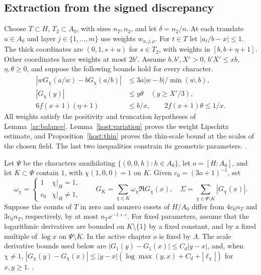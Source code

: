 \subsection{Extraction from the signed discrepancy}

Choose \(T\subset H\), \(T_2\subset A_0\), with sizes \(n_T,n_2\), and let \(\delta=n_2/n\). At each translate \(u\in A_0\) and layer \(j\in\{1,\dots,m\}\) use weights \(w_{u,j,\rho}\). For \(t\in T\) let \(|a_t/b-x|\le1\). The thick coordinates are \((0,1,s+u)\) for \(s\in T_2\), with weights in \([b,b+\eta+1]\). Other coordinates have weights at most \(2b'\). Assume \(b,b',X'>0\), \(b'X'\le xb\), \(\eta,\theta\ge0\), and suppose the following bounds hold for every character.
\begin{align*}
 |wG_\chi(a/w)-bG_\chi(a/b)|
 &\le 3a|w-b|/\min(w,b),\\
 |G_\chi(y)|&\le y\theta \quad (y\ge X'/3),\\
 6f(x+1)(\eta+1)&\le b/x,\qquad
 2f(x+1)\theta\le 1/x .
\end{align*}
All weights satisfy the positivity and truncation hypotheses of Lemma~\ref{ar:balance}. Lemma~\ref{host:variation} proves the weight Lipschitz estimate, and Proposition~\ref{host:thin} proves the thin-scale bound at the scales of the chosen field. The last two inequalities constrain its geometric parameters. \quad
{}\quad
{}.

Let \(\Psi\) be the characters annihilating \(\{(0,0,h):h\in A_0\}\), let \(o=[H:A_0]\), and let \(K\subset\Psi\) contain \(1\), with \(\chi(1,0,0)=1\) on \(K\). Given \(c_0=(3o+1)^{-1}\), set
\[
 \omega_\chi=\begin{cases}1&\chi|_H=1,\\c_0&\chi|_H\ne1,\end{cases}\qquad
 G_K=\sum_{\chi\in K}\omega_\chi\Re G_\chi(x),\quad
 \Sigma=\sum_{\chi\in\Psi\setminus K}|G_\chi(x)|.
\]
Suppose the counts of \(T\) in zero and nonzero cosets of \(H/A_0\) differ from \(4c_0 n_T\) and \(3c_0 n_T\), respectively, by at most \(n_Tx^{-1+\varepsilon}\). For fixed parameters, assume that the logarithmic derivatives are bounded on \(K\setminus\{1\}\) by a fixed constant, and by a fixed multiple of \(\log x\) on \(\Psi\setminus K\). In the active chapter \(o\) is fixed by \(\Lambda\). The scale derivative bounds used below are \(|G_1(y)-G_1(x)|\le C_d|y-x|\), and, when \(\chi\ne1\), \(|G_\chi(y)-G_\chi(x)|\le|y-x|(\log\max(y,x)+C_d+|\ell_\chi|)\) for \(x,y\ge1\). \quad
{}\quad
{}.

